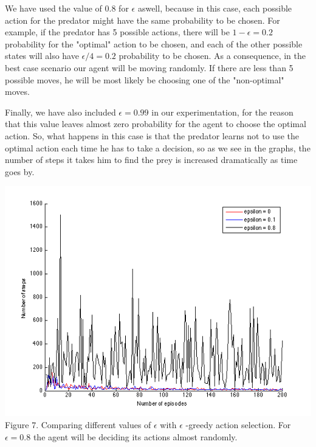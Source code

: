 \documentclass[a4paper,11pt]{article}
\begin{document}
We have used the value of 0.8 for $\epsilon$ aswell, because in this case, each possible action for the predator might have the same probability to be chosen. For example, if the predator has 5 possible actions, there will be $1-\epsilon = 0.2$ probability for the "optimal" action to be chosen, and each of the other possible states will also have $\epsilon /4 = 0.2$ probability to be chosen. As a consequence, in the best case scenario our agent will be moving randomly. If there are less than 5 possible moves, he will be most likely be choosing one of the "non-optimal" moves.

Finally, we have also included $\epsilon = 0.99$ in our experimentation, for the reason that this value leaves almost zero probability for the agent to choose the optimal action. So, what happens in this case is that the predator learns not to use the optimal action each time he has to take a decision, so as we see in the graphs, the number of steps it takes him to find the prey is increased dramatically as time goes by.

\begin{center}

\includegraphics[width=1.0\textwidth,height=0.4\textheight]{epsilonvalues.png}
\label{Figure 1}
Figure 7. Comparing different values of $\epsilon$ with $\epsilon$ -greedy action selection. For $\epsilon = 0.8$ the agent will be deciding its actions almost randomly. \vspace{1cm}
\end{center}
\end{document}
